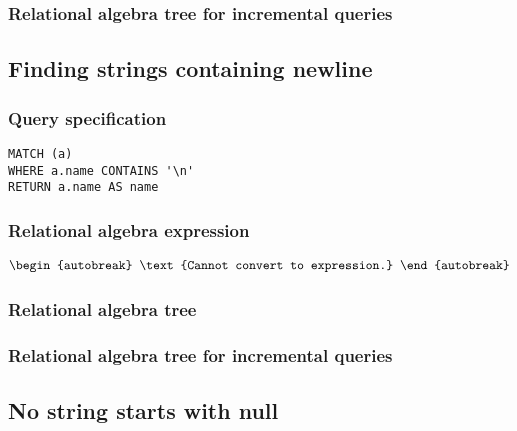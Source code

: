 
\subsubsection*{Relational algebra tree for incremental queries}


\subsection{Finding strings containing newline}

\subsubsection*{Query specification}

\begin{lstlisting}
MATCH (a)
WHERE a.name CONTAINS '\n'
RETURN a.name AS name
\end{lstlisting}

\subsubsection*{Relational algebra expression}

\begin{align*}
\begin{autobreak}
\text{Cannot convert to expression.}
\end{autobreak}
\end{align*}

\subsubsection*{Relational algebra tree}


\subsubsection*{Relational algebra tree for incremental queries}


\subsection{No string starts with null}

